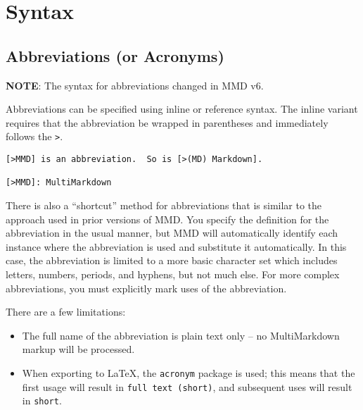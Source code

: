 
\def\mytitle{MultiMarkdown Syntax}
\def\myauthor{Fletcher T. Penney}
\def\revised{2017-06-07}




\tableofcontents

\chapter{Syntax}
\label{syntax}

\section{Abbreviations (or Acronyms)}
\label{abbreviationsoracronyms}

\textbf{NOTE}: The syntax for abbreviations changed in \gls{MMD} v6.

Abbreviations can be specified using inline or reference syntax. The inline variant requires that the abbreviation be wrapped in parentheses and immediately follows the \texttt{>}.

\begin{verbatim}
[>MMD] is an abbreviation.  So is [>(MD) Markdown].

[>MMD]: MultiMarkdown
\end{verbatim}

There is also a ``shortcut'' method for abbreviations that is similar to the approach used in prior versions of \gls{MMD}. You specify the definition for the abbreviation in the usual manner, but \gls{MMD} will automatically identify each instance where the abbreviation is used and substitute it automatically. In this case, the abbreviation is limited to a more basic character set which includes letters, numbers, periods, and hyphens, but not much else. For more complex abbreviations, you must explicitly mark uses of the abbreviation.

There are a few limitations:

\begin{itemize}
\item The full name of the abbreviation is plain text only -- no MultiMarkdown markup will be processed.

\item When exporting to LaTeX, the \texttt{acronym} package is used; this means that the first usage will result in \texttt{full text (short)}, and subsequent uses will result in \texttt{short}.

\end{itemize}

